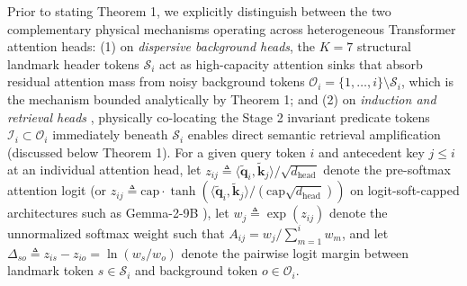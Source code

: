 \documentclass[conference,10pt]{IEEEtran}
\begin{document}
Prior to stating Theorem 1, we explicitly distinguish between the two complementary physical mechanisms operating across heterogeneous Transformer attention heads: (1) on \textit{dispersive background heads}, the $K=7$ structural landmark header tokens $\mathcal{S}_i$ act as high-capacity attention sinks \cite{xiao2023streamingllm} that absorb residual attention mass from noisy background tokens $\mathcal{O}_i = \{1, \dots, i\} \setminus \mathcal{S}_i$, which is the mechanism bounded analytically by Theorem 1; and (2) on \textit{induction and retrieval heads} \cite{vaswani2017attention}, physically co-locating the Stage 2 invariant predicate tokens $\mathcal{I}_i \subset \mathcal{O}_i$ immediately beneath $\mathcal{S}_i$ enables direct semantic retrieval amplification (discussed below Theorem 1). For a given query token $i$ and antecedent key $j \le i$ at an individual attention head, let $z_{ij} \triangleq \langle \tilde{\mathbf{q}}_i, \tilde{\mathbf{k}}_j \rangle / \sqrt{d_{\text{head}}}$ denote the pre-softmax attention logit (or $z_{ij} \triangleq \text{cap} \cdot \tanh(\langle \tilde{\mathbf{q}}_i, \tilde{\mathbf{k}}_j \rangle / (\text{cap}\sqrt{d_{\text{head}}}))$ on logit-soft-capped architectures such as Gemma-2-9B \cite{gemma2_2024}), let $w_j \triangleq \exp(z_{ij})$ denote the unnormalized softmax weight such that $A_{ij} = w_j / \sum_{m=1}^i w_m$, and let $\Delta_{so} \triangleq z_{is} - z_{io} = \ln(w_s / w_o)$ denote the pairwise logit margin between landmark token $s \in \mathcal{S}_i$ and background token $o \in \mathcal{O}_i$.
\end{document}
